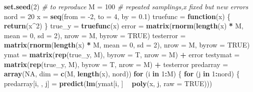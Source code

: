 \documentclass[]{article}
\newenvironment{Shaded}{\begin{snugshade}}{\end{snugshade}}
\newcommand{\KeywordTok}[1]{\textcolor[rgb]{0.13,0.29,0.53}{\textbf{#1}}}
\newcommand{\DataTypeTok}[1]{\textcolor[rgb]{0.13,0.29,0.53}{#1}}
\newcommand{\DecValTok}[1]{\textcolor[rgb]{0.00,0.00,0.81}{#1}}
\newcommand{\FloatTok}[1]{\textcolor[rgb]{0.00,0.00,0.81}{#1}}
\newcommand{\StringTok}[1]{\textcolor[rgb]{0.31,0.60,0.02}{#1}}
\newcommand{\CommentTok}[1]{\textcolor[rgb]{0.56,0.35,0.01}{\textit{#1}}}
\newcommand{\OtherTok}[1]{\textcolor[rgb]{0.56,0.35,0.01}{#1}}
\newcommand{\ControlFlowTok}[1]{\textcolor[rgb]{0.13,0.29,0.53}{\textbf{#1}}}
\newcommand{\OperatorTok}[1]{\textcolor[rgb]{0.81,0.36,0.00}{\textbf{#1}}}
\newcommand{\NormalTok}[1]{#1}
\begin{document}
\begin{Shaded}
\begin{Highlighting}[]
\KeywordTok{set.seed}\NormalTok{(}\DecValTok{2}\NormalTok{)  }\CommentTok{# to reproduce}
\NormalTok{M =}\StringTok{ }\DecValTok{100}  \CommentTok{# repeated samplings,x fixed but new errors}
\NormalTok{nord =}\StringTok{ }\DecValTok{20}
\NormalTok{x =}\StringTok{ }\KeywordTok{seq}\NormalTok{(}\DataTypeTok{from =} \DecValTok{-2}\NormalTok{, }\DataTypeTok{to =} \DecValTok{4}\NormalTok{, }\DataTypeTok{by =} \FloatTok{0.1}\NormalTok{)}
\NormalTok{truefunc =}\StringTok{ }\ControlFlowTok{function}\NormalTok{(x) \{}
    \KeywordTok{return}\NormalTok{(x}\OperatorTok{^}\DecValTok{2}\NormalTok{)}
\NormalTok{\}}
\NormalTok{true_y =}\StringTok{ }\KeywordTok{truefunc}\NormalTok{(x)}
\NormalTok{error =}\StringTok{ }\KeywordTok{matrix}\NormalTok{(}\KeywordTok{rnorm}\NormalTok{(}\KeywordTok{length}\NormalTok{(x) }\OperatorTok{*}\StringTok{ }\NormalTok{M, }\DataTypeTok{mean =} \DecValTok{0}\NormalTok{, }\DataTypeTok{sd =} \DecValTok{2}\NormalTok{), }\DataTypeTok{nrow =}\NormalTok{ M, }\DataTypeTok{byrow =} \OtherTok{TRUE}\NormalTok{)}
\NormalTok{testerror =}\StringTok{ }\KeywordTok{matrix}\NormalTok{(}\KeywordTok{rnorm}\NormalTok{(}\KeywordTok{length}\NormalTok{(x) }\OperatorTok{*}\StringTok{ }\NormalTok{M, }\DataTypeTok{mean =} \DecValTok{0}\NormalTok{, }\DataTypeTok{sd =} \DecValTok{2}\NormalTok{), }\DataTypeTok{nrow =}\NormalTok{ M, }
    \DataTypeTok{byrow =} \OtherTok{TRUE}\NormalTok{)}
\NormalTok{ymat =}\StringTok{ }\KeywordTok{matrix}\NormalTok{(}\KeywordTok{rep}\NormalTok{(true_y, M), }\DataTypeTok{byrow =}\NormalTok{ T, }\DataTypeTok{nrow =}\NormalTok{ M) }\OperatorTok{+}\StringTok{ }\NormalTok{error}
\NormalTok{testymat =}\StringTok{ }\KeywordTok{matrix}\NormalTok{(}\KeywordTok{rep}\NormalTok{(true_y, M), }\DataTypeTok{byrow =}\NormalTok{ T, }\DataTypeTok{nrow =}\NormalTok{ M) }\OperatorTok{+}\StringTok{ }\NormalTok{testerror}
\NormalTok{predarray =}\StringTok{ }\KeywordTok{array}\NormalTok{(}\OtherTok{NA}\NormalTok{, }\DataTypeTok{dim =} \KeywordTok{c}\NormalTok{(M, }\KeywordTok{length}\NormalTok{(x), nord))}
\ControlFlowTok{for}\NormalTok{ (i }\ControlFlowTok{in} \DecValTok{1}\OperatorTok{:}\NormalTok{M) \{}
    \ControlFlowTok{for}\NormalTok{ (j }\ControlFlowTok{in} \DecValTok{1}\OperatorTok{:}\NormalTok{nord) \{}
\NormalTok{        predarray[i, , j] =}\StringTok{ }\KeywordTok{predict}\NormalTok{(}\KeywordTok{lm}\NormalTok{(ymat[i, ] }\OperatorTok{~}\StringTok{ }\KeywordTok{poly}\NormalTok{(x, j, }\DataTypeTok{raw =} \OtherTok{TRUE}\NormalTok{)))}

\end{Highlighting}
\end{Shaded}
\end{document}
